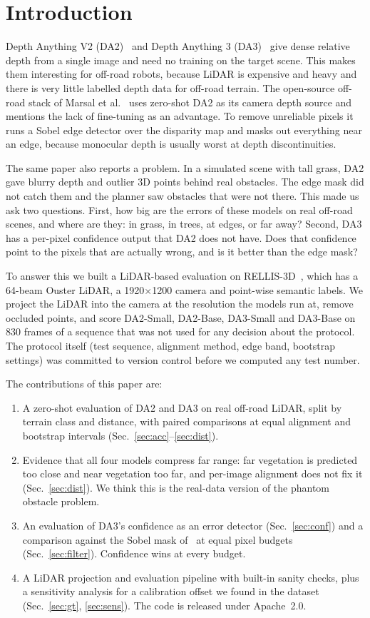 \documentclass[conference]{IEEEtran}
\begin{document}
\section{Introduction}
Depth Anything V2 (DA2)~\cite{da2} and Depth Anything 3 (DA3)~\cite{da3} give dense relative depth from a single image and need no training on the target scene. This makes them interesting for off-road robots, because LiDAR is expensive and heavy and there is very little labelled depth data for off-road terrain. The open-source off-road stack of Marsal et al.~\cite{offroadnav} uses zero-shot DA2 as its camera depth source and mentions the lack of fine-tuning as an advantage. To remove unreliable pixels it runs a Sobel edge detector over the disparity map and masks out everything near an edge, because monocular depth is usually worst at depth discontinuities.

The same paper also reports a problem. In a simulated scene with tall grass, DA2 gave blurry depth and outlier 3D points behind real obstacles. The edge mask did not catch them and the planner saw obstacles that were not there. This made us ask two questions. First, how big are the errors of these models on real off-road scenes, and where are they: in grass, in trees, at edges, or far away? Second, DA3 has a per-pixel confidence output that DA2 does not have. Does that confidence point to the pixels that are actually wrong, and is it better than the edge mask?

To answer this we built a LiDAR-based evaluation on RELLIS-3D~\cite{rellis}, which has a 64-beam Ouster LiDAR, a 1920$\times$1200 camera and point-wise semantic labels. We project the LiDAR into the camera at the resolution the models run at, remove occluded points, and score DA2-Small, DA2-Base, DA3-Small and DA3-Base on 830 frames of a sequence that was not used for any decision about the protocol. The protocol itself (test sequence, alignment method, edge band, bootstrap settings) was committed to version control before we computed any test number.

The contributions of this paper are:
\begin{enumerate}
\item A zero-shot evaluation of DA2 and DA3 on real off-road LiDAR, split by terrain class and distance, with paired comparisons at equal alignment and bootstrap intervals (Sec.~\ref{sec:acc}--\ref{sec:dist}).
\item Evidence that all four models compress far range: far vegetation is predicted too close and near vegetation too far, and per-image alignment does not fix it (Sec.~\ref{sec:dist}). We think this is the real-data version of the phantom obstacle problem.
\item An evaluation of DA3's confidence as an error detector (Sec.~\ref{sec:conf}) and a comparison against the Sobel mask of~\cite{offroadnav} at equal pixel budgets (Sec.~\ref{sec:filter}). Confidence wins at every budget.
\item A LiDAR projection and evaluation pipeline with built-in sanity checks, plus a sensitivity analysis for a calibration offset we found in the dataset (Sec.~\ref{sec:gt}, \ref{sec:sens}). The code is released under Apache~2.0.
\end{enumerate}
\end{document}
